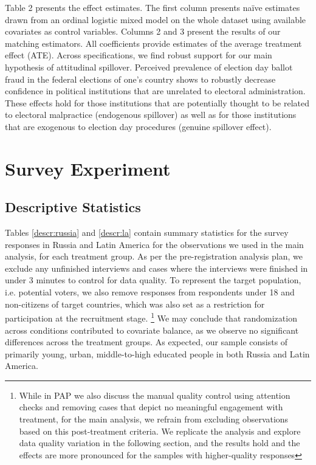 \documentclass[11pt, ngerman,english,a4]{article}
\begin{document}
Table 2 presents the effect estimates. The first column presents na{\"i}ve estimates drawn from an ordinal logistic mixed model on the whole dataset using available covariates as control variables. Columns 2 and 3 present the results of our matching estimators. All coefficients provide estimates of the average treatment effect (ATE). Across specifications, we find robust support for our main hypothesis of attitudinal spillover. Perceived prevalence of election day ballot fraud in the federal elections of one's country shows to robustly decrease confidence in political institutions that are unrelated to electoral administration. These effects hold for those institutions that are potentially thought to be related to electoral malpractice (endogenous spillover) as well as for those institutions that are exogenous to election day procedures (genuine spillover effect). 


\clearpage
\section{Survey Experiment} 
\subsection{Descriptive Statistics}
\onehalfspacing


Tables \ref{descr:russia} and \ref{descr:la} contain summary statistics for the survey responses in Russia and Latin America for the observations we used in the main analysis, for each treatment group. As per the pre-registration analysis plan, we exclude any unfinished interviews and cases where the interviews were finished in under 3 minutes to control for data quality. To represent the target population, i.e. potential voters, we also remove responses from respondents under 18 and non-citizens of target countries, which was also set as a restriction for participation at the recruitment stage. \footnote{While in PAP we also discuss the manual quality control using attention checks and removing cases that depict no meaningful engagement with treatment, for the main analysis, we refrain from excluding observations based on this post-treatment criteria. We replicate the analysis and explore data quality variation in the following section, and the results hold and the effects are more pronounced for the samples with higher-quality responses
} We may conclude that randomization across conditions contributed to covariate balance, as we observe no significant differences across the treatment groups. As expected, our sample consists of primarily young, urban, middle-to-high educated people in both Russia and Latin America.   
\end{document}
